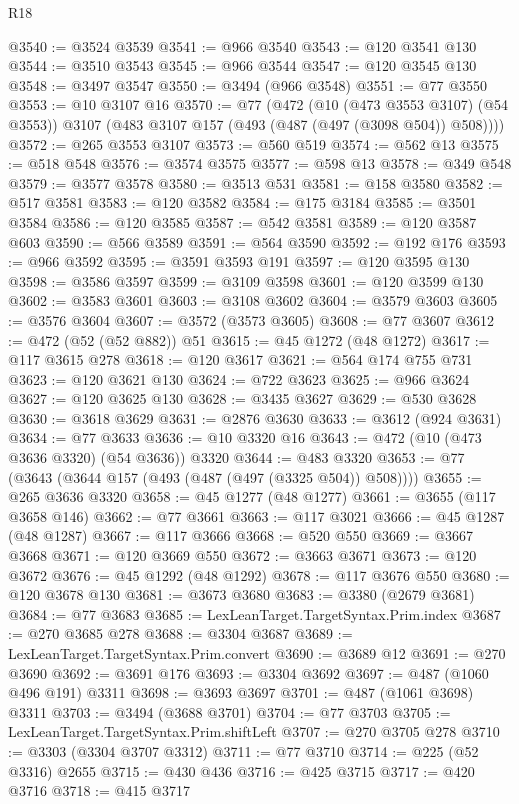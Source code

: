 \begin{lexlean}{R18}
\begin{coremodule}
@3540 := @3524 @3539
@3541 := @966 @3540
@3543 := @120 @3541 @130
@3544 := @3510 @3543
@3545 := @966 @3544
@3547 := @120 @3545 @130
@3548 := @3497 @3547
@3550 := @3494 (@966 @3548)
@3551 := @77 @3550
@3553 := @10 @3107 @16
@3570 := @77
    (@472
      (@10 (@473 @3553 @3107) (@54 @3553))
      @3107
      (@483 @3107 @157 (@493 (@487 (@497 (@3098 @504)) @508))))
@3572 := @265 @3553 @3107
@3573 := @560 @519
@3574 := @562 @13
@3575 := @518 @548
@3576 := @3574 @3575
@3577 := @598 @13
@3578 := @349 @548
@3579 := @3577 @3578
@3580 := @3513 @531
@3581 := @158 @3580
@3582 := @517 @3581
@3583 := @120 @3582
@3584 := @175 @3184
@3585 := @3501 @3584
@3586 := @120 @3585
@3587 := @542 @3581
@3589 := @120 @3587 @603
@3590 := @566 @3589
@3591 := @564 @3590
@3592 := @192 @176
@3593 := @966 @3592
@3595 := @3591 @3593 @191
@3597 := @120 @3595 @130
@3598 := @3586 @3597
@3599 := @3109 @3598
@3601 := @120 @3599 @130
@3602 := @3583 @3601
@3603 := @3108 @3602
@3604 := @3579 @3603
@3605 := @3576 @3604
@3607 := @3572 (@3573 @3605)
@3608 := @77 @3607
@3612 := @472 (@52 (@52 @882)) @51
@3615 := @45 @1272 (@48 @1272)
@3617 := @117 @3615 @278
@3618 := @120 @3617
@3621 := @564 @174 @755 @731
@3623 := @120 @3621 @130
@3624 := @722 @3623
@3625 := @966 @3624
@3627 := @120 @3625 @130
@3628 := @3435 @3627
@3629 := @530 @3628
@3630 := @3618 @3629
@3631 := @2876 @3630
@3633 := @3612 (@924 @3631)
@3634 := @77 @3633
@3636 := @10 @3320 @16
@3643 := @472 (@10 (@473 @3636 @3320) (@54 @3636)) @3320
@3644 := @483 @3320
@3653 := @77 (@3643 (@3644 @157 (@493 (@487 (@497 (@3325 @504)) @508))))
@3655 := @265 @3636 @3320
@3658 := @45 @1277 (@48 @1277)
@3661 := @3655 (@117 @3658 @146)
@3662 := @77 @3661
@3663 := @117 @3021
@3666 := @45 @1287 (@48 @1287)
@3667 := @117 @3666
@3668 := @520 @550
@3669 := @3667 @3668
@3671 := @120 @3669 @550
@3672 := @3663 @3671
@3673 := @120 @3672
@3676 := @45 @1292 (@48 @1292)
@3678 := @117 @3676 @550
@3680 := @120 @3678 @130
@3681 := @3673 @3680
@3683 := @3380 (@2679 @3681)
@3684 := @77 @3683
@3685 := LexLeanTarget.TargetSyntax.Prim.index
@3687 := @270 @3685 @278
@3688 := @3304 @3687
@3689 := LexLeanTarget.TargetSyntax.Prim.convert
@3690 := @3689 @12
@3691 := @270 @3690
@3692 := @3691 @176
@3693 := @3304 @3692
@3697 := @487 (@1060 @496 @191) @3311
@3698 := @3693 @3697
@3701 := @487 (@1061 @3698) @3311
@3703 := @3494 (@3688 @3701)
@3704 := @77 @3703
@3705 := LexLeanTarget.TargetSyntax.Prim.shiftLeft
@3707 := @270 @3705 @278
@3710 := @3303 (@3304 @3707 @3312)
@3711 := @77 @3710
@3714 := @225 (@52 @3316) @2655
@3715 := @430 @436
@3716 := @425 @3715
@3717 := @420 @3716
@3718 := @415 @3717

\end{coremodule}
\end{lexlean}
